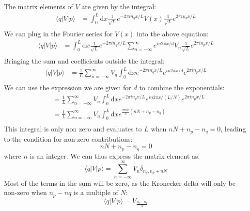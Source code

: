 \documentclass[12pt]{article}
\begin{document}
\subsection{}
The matrix elements of $V$ are given by the integral:
\begin{equation}
  \begin{aligned}
    \langle q|V| p\rangle &=\int_{0}^{L} \mathrm{d} x \frac{1}{\sqrt{L}} e^{-2 \pi i n_{q} x / L} V(x) \frac{1}{\sqrt{L}} e^{2 \pi i n_{p} x / L} \\
\end{aligned}
\end{equation}
We can plug in the Fourier series for $V(x)$ into the above equation:
\begin{equation}
  \begin{aligned}
    \langle q|V| p\rangle &=\int_{0}^{L} \mathrm{d} x \frac{1}{\sqrt{L}} e^{-2 \pi i n_{q} x / L} \sum_{n=-\infty}^{\infty} e^{i n 2 \pi x / d} V_{n} \frac{1}{\sqrt{L}} e^{2 \pi i n_{p} x / L} \\
\end{aligned}
\end{equation}
Bringing the sum and coefficients outside the integral:
\begin{equation}
  \begin{aligned}
    \langle q|V| p\rangle &=\frac{1}{L}\sum_{n=-\infty}^{\infty} V_{n}\int_{0}^{L} \mathrm{d} x e^{-2 \pi i n_{q} x / L} e^{i n 2 \pi x / d} e^{2 \pi i n_{p} x / L} \\
\end{aligned}
\end{equation}
We can use the expression we are given for $d$ to combine the exponentials:
\begin{equation}
  \begin{aligned}
    &=\frac{1}{L}\sum_{n=-\infty}^{\infty} V_{n}\int_{0}^{L} \mathrm{d} x e^{-2 \pi i n_{q} x / L} e^{i n 2 \pi x / (L/N)} e^{2 \pi i n_{p} x / L} \\
    &=\frac{1}{L}\sum_{n=-\infty}^{\infty} V_{n}\int_{0}^{L} \mathrm{d} x e^{\frac{2\pi i x}{L}\left( nN+n_{p}-n_{q}\right)}\\
\end{aligned}
\end{equation}
This integral is only non zero and evaluates to $L$ when $nN + n_{p} - n_{q} = 0$, leading to the condition for non-zero contributions:
\begin{equation}
  nN + n_{p} - n_{q} = 0
\end{equation}
where $n$ is an integer.
We can thus express the matrix element as:
\begin{equation}
  \langle q|V| p\rangle = \sum_{n=-\infty}^{\infty} V_{n} \delta_{n_{q}, n_{p} + nN}
\end{equation}
Most of the terms in the sum will be zero, as the Kronecker delta will only be non-zero when $n_{p}-n{q}$ is a multiple of $N$:
\begin{equation}
  \langle q|V| p\rangle = V_{\frac{n_{q}-n_{p}}{N}}
\end{equation}
\end{document}
